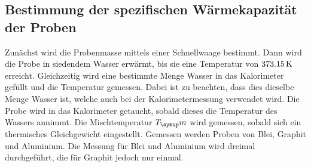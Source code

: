 \subsection{Bestimmung der spezifischen Wärmekapazität der Proben}
Zunächst wird die Probenmasse mittels einer Schnellwaage bestimmt. Dann wird die
Probe in siedendem Wasser erwärmt, bis sie eine Temperatur von $373.15\,\si{\kelvin}$
erreicht. Gleichzeitig wird eine bestimmte Menge Wasser in das Kalorimeter
gefüllt und die Temperatur gemessen. Dabei ist zu beachten, dass dies dieselbe
Menge Wasser ist, welche auch bei der Kalorimetermessung verwendet wird.
Die Probe wird in das Kalorimeter getaucht,
sobald dieses die Temperatur des Wassers annimmt. Die Mischtemperatur $T_\su{m}$
wird gemessen, sobald sich ein thermisches Gleichgewicht eingestellt.
Gemessen werden Proben von Blei, Graphit und Aluminium. Die Messung für Blei
und Aluminium wird dreimal durchgeführt, die für Graphit jedoch nur einmal.
